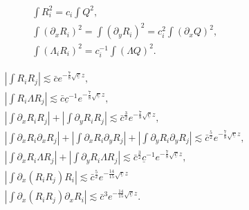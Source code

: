 \documentclass[10pt,a4paper]{amsart}
\begin{document}
		\begin{align} 
			& \int R_i^2=c_i \int Q^2, \label{id:Ri}\\  
			& \int (\partial_x R_i)^2=\int (\partial_y R_i)^2=c_i^2 \int (\partial_xQ)^2,\label{id:dRi} \\
			&\int (\Lambda_i R_i)^2=c_i^{-1} \int (\Lambda Q)^2.\label{Lambda:dRi}
		\end{align}

		\begin{align} 
			& \left| \int R_i R_j \right| \lesssim  \bar{c}e^{-\frac78  \sqrt{\underline{c}} z}, \label{est:R1R2.1}\\
			& \left| \int R_i \Lambda R_j \right| \lesssim  \bar{c}\underline{c}^{-1}e^{-\frac78 \sqrt{\underline{c}} z} , \label{est:R1R2.2}\\  
			& \left| \int \partial_xR_i R_j \right|+\left| \int \partial_yR_i R_j \right| \lesssim  \bar{c}^{\frac32}e^{-\frac78 \sqrt{\underline{c}} z},
			\label{est:R1R2.3} \\ 
			& \left| \int \partial_xR_i \partial_xR_j \right|+\left| \int \partial_xR_i \partial_yR_j \right|+\left| \int \partial_yR_i \partial_yR_j \right| \lesssim  \bar{c}^{\frac52}e^{-\frac78 \sqrt{\underline{c}} z},
			\label{est:R1R2.4} \\ 
			&\left| \int \partial_xR_i \Lambda R_j \right|+\left| \int \partial_yR_i \Lambda R_j \right| 
			\lesssim \bar{c}^{\frac32}\underline{c}^{-1}e^{-\frac78 \sqrt{\underline{c}} z}, \label{est:R1R2.5} \\ 
			&\left| \int \partial_x(R_iR_j) R_i \right|  
			\lesssim \bar{c}^{\frac52}e^{-\frac{14}{15}\sqrt{\underline{c}} z} \label{est:R1R2.6}\\ 
			&\left| \int \partial_x(R_iR_j) \partial_xR_i \right|  
			\lesssim \bar{c}^{3}e^{-\frac{14}{15}\sqrt{\underline{c}} z} . \label{est:R1R2.7}
		\end{align}
\end{document}
